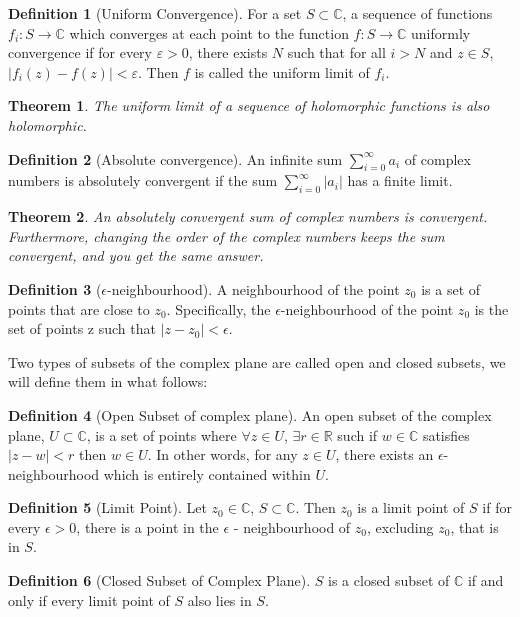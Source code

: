 \documentclass{article}
\newtheorem{thm}{Theorem}[section]
\theoremstyle{definition}
\newtheorem{definition}{Definition}[section]
\theoremstyle{definition}
\theoremstyle{definition}
\newcommand{\C}{\mathbb{C}}
\begin{document}
\begin{definition}[Uniform Convergence]
    For a set $S\subset \C$, a sequence of functions $f_i:S\rightarrow\C$ which converges at each point to the function $f:S\rightarrow\C$ uniformly convergence if for every $\varepsilon>0$, there exists $N$ such that for all $i>N$ and $z\in S$, $|f_i(z)-f(z)|<\varepsilon$. Then $f$ is called the uniform limit of $f_i$.
\end{definition}
\begin{thm}
The uniform limit of a sequence of holomorphic functions is also holomorphic.
\end{thm}
\begin{definition}[Absolute convergence]
    An infinite sum $\sum_{i=0}^\infty a_i$ of complex numbers is absolutely convergent if the sum $\sum_{i=0}^\infty |a_i|$ has a finite limit.
\end{definition}
\begin{thm}
    An absolutely convergent sum of complex numbers is convergent. Furthermore, changing the order of the complex numbers keeps the sum convergent, and you get the same answer.
\end{thm}

\begin{definition}[$\epsilon$-neighbourhood]
    A neighbourhood of the point $z_0$ is a set of points that are close to $z_0.$ Specifically, the $\epsilon$-neighbourhood of the point $z_0$ is the set of points z such that $|z-z_0|<\epsilon$.
\end{definition}

Two types of subsets of the complex plane are called open and closed subsets, we will define them in what follows: 

\begin{definition}[Open Subset of complex plane]
    An open subset of the complex plane,  $U \subset \mathbb{C}$, is a set of points where $\forall z\in U$, $\exists  r\in\mathbb{R}$ such if $w\in \mathbb{C}$ satisfies $|z-w|<r$ then $w\in U$. In other words, for any $z\in U$, there exists an $\epsilon$-neighbourhood which is entirely contained within $U$.
\end{definition}
\begin{definition}[Limit Point]
    Let $z_0\in\mathbb{C}$, $S\subset \mathbb{C}$. Then $z_0$ is a limit point of $S$ if for every $\epsilon >0$, there is a point in the $\epsilon$ - neighbourhood of $z_0$, excluding $z_0$, that is in $S$.
\end{definition}
\begin{definition}[Closed Subset of Complex Plane]
   $S$ is a closed subset of $\mathbb{C}$ if and only if every limit point of $S$ also lies in $S$.
\end{definition}
\end{document}
